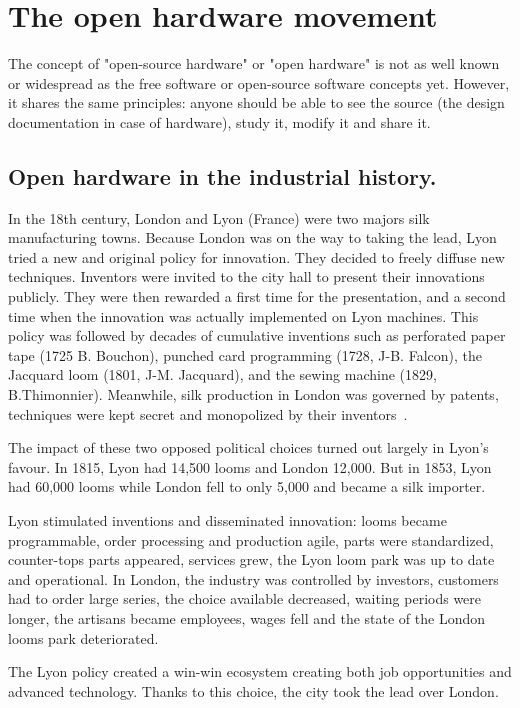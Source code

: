 \section{The open hardware movement} %

The concept of "open-source hardware" or "open hardware" is not as well known or widespread as the free software or open-source software concepts yet. However, it shares the same principles: anyone should be able to see the source (the design documentation in case of hardware), study it, modify it and share it.


\subsection{Open hardware in the industrial history.} %

In the 18th century, London and Lyon (France) were two majors silk manufacturing towns. Because London was on the way to taking the lead, Lyon tried a new and original policy for innovation. They decided to freely diffuse new techniques. Inventors were invited to the city hall to present their innovations publicly. They were then rewarded a first time for the presentation, and a second time when the innovation was actually implemented on Lyon machines. This policy was followed by decades of cumulative inventions such as perforated paper tape (1725 B. Bouchon), punched card programming (1728, J-B. Falcon), the Jacquard loom (1801, J-M. Jacquard), and the sewing machine (1829, B.Thimonnier). Meanwhile, silk production in London was governed by patents, techniques were kept secret and monopolized by their inventors~\parencite{alain1997fate}.

The impact of these two opposed political choices turned out largely in Lyon’s favour. In 1815, Lyon had 14,500 looms and London 12,000. But in 1853, Lyon had 60,000 looms while London fell to only 5,000 and became a silk importer.

Lyon stimulated inventions and disseminated innovation: looms became programmable, order processing and production agile, parts were standardized, counter-tops parts appeared, services grew, the Lyon loom park was up to date and operational.
In London, the industry was controlled by investors, customers had to order large series, the choice available decreased, waiting periods were longer, the artisans became employees, wages fell and the state of the London looms park deteriorated.

The Lyon policy created a win-win ecosystem creating both job opportunities and advanced technology. Thanks to this choice, the city took the lead over London.


